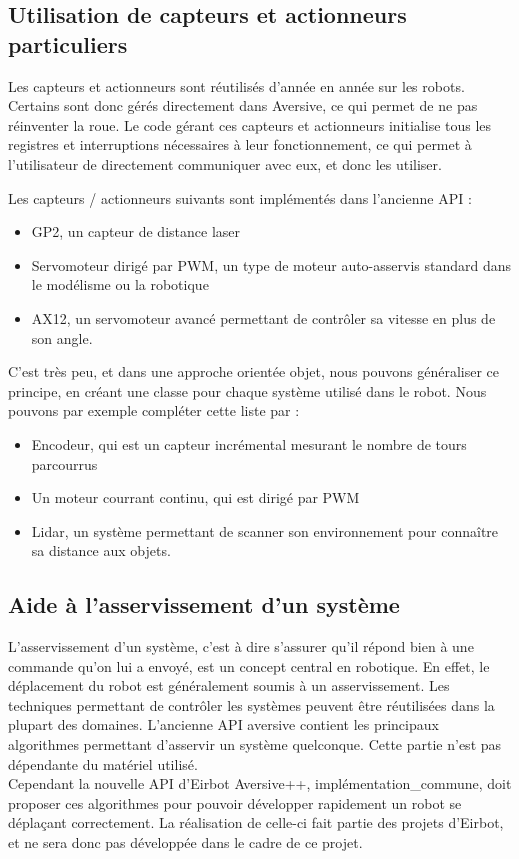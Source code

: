 \subsection{Utilisation de capteurs et actionneurs particuliers}

Les capteurs et actionneurs sont réutilisés d'année en année sur les robots. Certains sont donc gérés directement dans Aversive, ce qui permet de ne pas réinventer la roue. Le code gérant ces capteurs et actionneurs initialise tous les registres et interruptions nécessaires à leur fonctionnement, ce qui permet à l'utilisateur de directement communiquer avec eux, et donc les utiliser.

Les capteurs / actionneurs suivants sont implémentés dans l'ancienne API :
\begin{itemize}
    \item{GP2, un capteur de distance laser}
    \item{Servomoteur dirigé par PWM, un type de moteur auto-asservis standard dans le modélisme ou la robotique}
    \item{AX12, un servomoteur avancé permettant de contrôler sa vitesse en plus de son angle.}
\end{itemize}

C'est très peu, et dans une approche orientée objet, nous pouvons généraliser ce principe, en créant une classe pour chaque système utilisé dans le robot. Nous pouvons par exemple compléter cette liste par : 

\begin{itemize}
    \item{Encodeur, qui est un capteur incrémental mesurant le nombre de tours parcourrus}
    \item{Un moteur courrant continu, qui est dirigé par PWM}
    \item{Lidar, un système permettant de scanner son environnement pour connaître sa distance aux objets.}
\end{itemize}


\subsection{Aide à l'asservissement d'un système}

L'asservissement d'un système, c'est à dire s'assurer qu'il répond bien à une commande qu'on lui a envoyé, est un concept central en robotique. En effet, le déplacement du robot est généralement soumis à un asservissement. Les techniques permettant de contrôler les systèmes peuvent être réutilisées dans la plupart des domaines. L'ancienne API aversive contient les principaux algorithmes permettant d'asservir un système quelconque. Cette partie n'est pas dépendante du matériel utilisé. \\
Cependant la nouvelle API d'Eirbot Aversive++, implémentation\_commune, doit proposer ces algorithmes pour pouvoir développer rapidement un robot se déplaçant correctement. La réalisation de celle-ci fait partie des projets d'Eirbot, et ne sera donc pas développée dans le cadre de ce projet.



